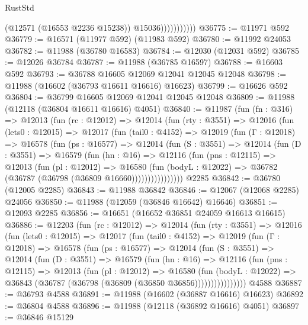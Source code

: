 \begin{lexlean}{RustStd}
\begin{coremodule}
                          (@12571 (@16553 @2236 @15238))
                          @15036)))))))))))
@36775 := @11971 @592
@36779 := @16571 (@11977 @592) (@11983 @592)
@36780 := @11992 @24053
@36782 := @11988 (@36780 @16583)
@36784 := @12030 (@12031 @592)
@36785 := @12026 @36784
@36787 := @11988 (@36785 @16597)
@36788 := @16603 @592
@36793 := @36788 @16605 @12069 @12041 @12045 @12048
@36798 := @11988 (@16602 (@36793 @16611 @16616) @16623)
@36799 := @16626 @592
@36804 := @36799 @16605 @12069 @12041 @12045 @12048
@36809 := @11988 (@12118 (@36804 @16611 @16616) @4051)
@36840 := @11987
    (fun (fn : @316) =>
    @12013
      (fun (rc : @12012) =>
      @12014
        (fun (rty : @3551) =>
        @12016
          (fun (lets0 : @12015) =>
          @12017
            (fun (tail0 : @4152) =>
            @12019
              (fun (Γ : @12018) =>
              @16578
                (fun (ps : @16577) =>
                @12014
                  (fun (S : @3551) =>
                  @12014
                    (fun (D : @3551) =>
                    @16579
                      (fun (hn : @16) =>
                      @12116
                        (fun (pns : @12115) =>
                        @12013
                          (fun (pl : @12012) =>
                          @16580
                            (fun (bodyL : @12022) =>
                            @36782 (@36787 (@36798 (@36809 @16660))))))))))))))))
    @2285
@36842 := @36780 (@12005 @2285)
@36843 := @11988 @36842
@36846 := @12067 (@12068 @2285) @24056
@36850 := @11988 (@12059 (@36846 @16642) @16646)
@36851 := @12093 @2285
@36856 := @16651 (@16652 @36851 @24059 @16613 @16615)
@36886 := @12203
    (fun (rc : @12012) =>
    @12014
      (fun (rty : @3551) =>
      @12016
        (fun (lets0 : @12015) =>
        @12017
          (fun (tail0 : @4152) =>
          @12019
            (fun (Γ : @12018) =>
            @16578
              (fun (ps : @16577) =>
              @12014
                (fun (S : @3551) =>
                @12014
                  (fun (D : @3551) =>
                  @16579
                    (fun (hn : @16) =>
                    @12116
                      (fun (pns : @12115) =>
                      @12013
                        (fun (pl : @12012) =>
                        @16580
                          (fun (bodyL : @12022) =>
                          @36843 (@36787 (@36798 (@36809 (@36850 @36856))))))))))))))))
    @4588
@36887 := @36793 @4588
@36891 := @11988 (@16602 (@36887 @16616) @16623)
@36892 := @36804 @4588
@36896 := @11988 (@12118 (@36892 @16616) @4051)
@36897 := @36846 @15129

\end{coremodule}
\end{lexlean}
